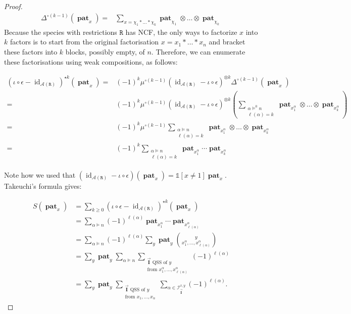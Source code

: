 \documentclass[12pt, reqno]{amsart}
\theoremstyle{definition}
\newcommand{\III}{\vec{\mathbf{I}}}
\DeclareMathOperator{\id}{id}
\DeclareMathOperator{\pat}{\mathbf{pat}}
\begin{document}
\begin{proof}
\begin{align*}
\Delta^{\circ (k-1)} (\pat_x)
    =& \sum_{x = \chi_1 \ast \dots \ast \chi_k} \pat_{\chi_1}\otimes \dots \otimes \pat_{\chi_k}
\end{align*}
Because the species with restrictions $\mathtt{R}$ has NCF, the only ways to factorize $x$ into $k$ factors is to start from the original factorisation $x = x_1 \ast \dots \ast x_n$ and bracket these factors into $k$ blocks, possibly empty, of $n$.
Therefore, we can enumerate these factorisations using weak compositions, as follows:

\begin{align*}
(\iota \circ \epsilon -  \id_{\mathcal A (\mathtt{R})})^{\star k} (\pat_x)
    =& (-1)^k  \mu^{\circ(k-1)}( \id_{\mathcal A (\mathtt{R})} - \iota \circ \epsilon)^{\otimes k} \Delta^{\circ(k-1)} (\pat_x)\\
    =& (-1)^k  \mu^{\circ(k-1)}( \id_{\mathcal A (\mathtt{R})} - \iota \circ \epsilon)^{\otimes k}\left(\sum_{\substack{\alpha\models^0 n \\ \ell(\alpha) = k}} \pat_{x^{\alpha}_1} \otimes \dots \otimes \pat_{x^{\alpha}_k} \right) \\
    =&  (-1)^k  \mu^{\circ(k-1)} \sum_{\substack{\alpha\models n \\ \ell(\alpha) = k}}  \pat_{x^{\alpha}_1} \otimes \dots \otimes \pat_{x^{\alpha}_k}\\
    =&  (-1)^k \sum_{\substack{\alpha\models n \\ \ell(\alpha) = k}}  \pat_{x^{\alpha}_1}  \cdots \pat_{x^{\alpha}_k}
\end{align*}

Note how we used that $(\id_{\mathcal A (\mathtt{R})} - \iota \circ \epsilon ) (\pat_x) = \mathbb{1}[x \neq 1]\pat_x$.
Takeuchi's formula gives:

\begin{align*}
S(\pat_x)&= \sum_{k\geq 0 } (\iota \circ \epsilon -  \id_{\mathcal A (\mathtt{R})})^{\star k} (\pat_x) \\
         &= \sum_{\alpha \models n} (-1)^{\ell(\alpha)} \pat_{x^{\alpha}_1} \cdots \pat_{x^{\alpha}_{\ell(\alpha)}}\\
         &= \sum_{\alpha \models n } (-1)^{\ell(\alpha)} \sum_y \pat_y \binom{y}{x^{\alpha}_1,  \dots , x^{\alpha}_{\ell(\alpha)}}\\
         &= \sum_y \pat_y \sum_{\alpha \models n} \sum_{  \substack{\III \text{ QSS of $y$}\\ \text{from }x^{\alpha}_1,  \dots , x^{\alpha}_{\ell(\alpha)} }} (-1)^{\ell(\alpha)}\\
         &= \sum_y \pat_y \sum_{  \substack{\III \text{ QSS of $y$}\\ \text{from }x_1 , \dots ,  x_n }} \sum_{\alpha \in \mathcal I^{x, y}_{\III}} (-1)^{\ell(\alpha)}.
\end{align*}


\end{proof}
\end{document}
